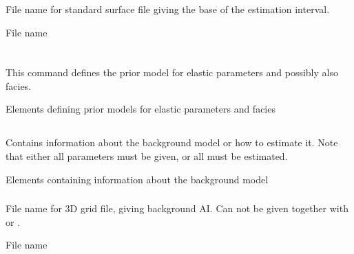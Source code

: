 \subsubsection{}
 \slist
   \item \Description File name for standard surface file giving the base of the estimation interval.
   \item \Argument File name
   \item \Default
 \elist


\section{}
 \slist
   \item \Description This command defines the prior model for elastic parameters and possibly also facies.
   \item \Argument Elements defining prior models for elastic parameters and facies
   \item \Default
 \elist

\subsection{}
 \slist
   \item \Description Contains information about the background model or how to estimate it. Note that either all parameters must be given, or all must be estimated.
   \item \Argument Elements containing information about the background model
   \item \Default
 \elist

\subsubsection{}
 \slist
   \item \Description File name for 3D grid file, giving background
   AI. Can not be given together with  or .
   \item \Argument File name
   \item \Default
 \elist

